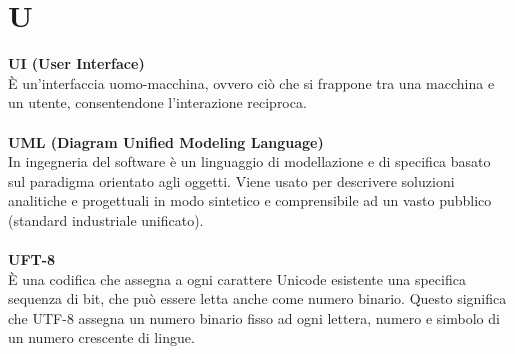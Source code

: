 \section{U}
\textbf{UI (User Interface)}\\
È un'interfaccia uomo-macchina, ovvero ciò che si frappone tra una macchina e un utente, consentendone l'interazione reciproca. \\ \\
\textbf{UML (Diagram Unified Modeling Language)}\\
In ingegneria del software è un linguaggio di modellazione e di specifica basato sul paradigma orientato agli oggetti. Viene usato per descrivere soluzioni analitiche e progettuali in modo sintetico e comprensibile ad un vasto pubblico (standard industriale unificato). \\ \\
\textbf{UFT-8}\\
È una codifica che assegna a ogni carattere Unicode esistente una specifica sequenza di bit, che può essere letta anche come numero binario. Questo significa che UTF-8 assegna un numero binario fisso ad ogni lettera, numero e simbolo di un numero crescente di lingue. \\ \\
\clearpage